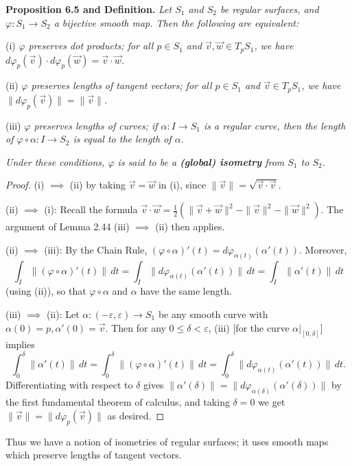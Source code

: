 \documentclass[leqno]{book}
\begin{document}
\noindent\textbf{Proposition 6.5 and Definition.} \emph{Let $S_1$ and $S_2$ be regular surfaces, and $\varphi:S_1\to S_2$ a bijective smooth map.  Then the following are equivalent:}

(i) \emph{$\varphi$ preserves dot products; for all $p\in S_1$ and $\vec v,\vec w\in T_pS_1$, we have $d\varphi_p(\vec v)\cdot d\varphi_p(\vec w)=\vec v\cdot\vec w$.}

(ii) \emph{$\varphi$ preserves lengths of tangent vectors; for all $p\in S_1$ and $\vec v\in T_pS_1$, we have $\|d\varphi_p(\vec v)\|=\|\vec v\|$.}

(iii) \emph{$\varphi$ preserves lengths of curves; if $\alpha:I\to S_1$ is a regular curve, then the length of $\varphi\circ\alpha:I\to S_2$ is equal to the length of $\alpha$.}

\emph{Under these conditions, $\varphi$ is said to be a \textbf{(global) isometry} from $S_1$ to $S_2$.}\\
\begin{proof}
(i) $\implies$ (ii) by taking $\vec v=\vec w$ in (i), since $\|\vec v\|=\sqrt{\vec v\cdot\vec v}$.

(ii) $\implies$ (i): Recall the formula $\vec v\cdot\vec w=\frac 12(\|\vec v+\vec w\|^2-\|\vec v\|^2-\|\vec w\|^2)$.  The argument of Lemma 2.44 (iii) $\implies$ (ii) then applies.

(ii) $\implies$ (iii): By the Chain Rule, $(\varphi\circ\alpha)'(t)=d\varphi_{\alpha(t)}(\alpha'(t))$.  Moreover,
$$\int_I\|(\varphi\circ\alpha)'(t)\|\,dt=\int_I\|d\varphi_{\alpha(t)}(\alpha'(t))\|\,dt=\int_I\|\alpha'(t)\|\,dt$$
(using (ii)), so that $\varphi\circ\alpha$ and $\alpha$ have the same length.

(iii) $\implies$ (ii): Let $\alpha:(-\varepsilon,\varepsilon)\to S_1$ be any smooth curve with $\alpha(0)=p,\alpha'(0)=\vec v$.  Then for any $0\leqslant\delta<\varepsilon$, (iii) [for the curve $\alpha|_{[0,\delta]}$] implies
$$\int_0^\delta\|\alpha'(t)\|\,dt=\int_0^\delta\|(\varphi\circ\alpha)'(t)\|\,dt=\int_0^\delta\|d\varphi_{\alpha(t)}(\alpha'(t))\|\,dt.$$
Differentiating with respect to $\delta$ gives $\|\alpha'(\delta)\|=\|d\varphi_{\alpha(\delta)}(\alpha'(\delta))\|$ by the first fundamental theorem of calculus, and taking $\delta=0$ we get $\|\vec v\|=\|d\varphi_p(\vec v)\|$ as desired.
\end{proof}

\noindent Thus we have a notion of isometries of regular surfaces; it uses smooth maps which preserve lengths of tangent vectors. %
\end{document}
